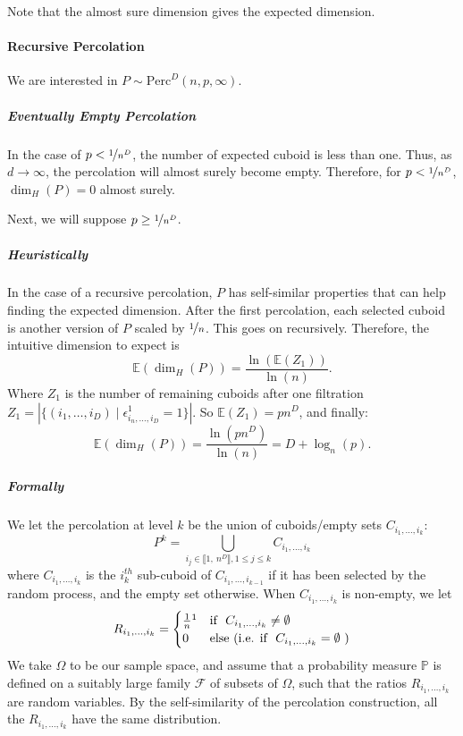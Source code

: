 Note that the almost sure dimension gives the expected dimension.

\paragraph{Recursive Percolation}
We are interested in $P \sim \text{Perc}^D(n,p,\infty)$.

\subparagraph{Eventually Empty Percolation}
In the case of $p < \nicefrac{1}{n^D}$, the number of expected cuboid is less than one.
Thus, as $d \to \infty$, the percolation will almost surely become empty.
Therefore, for $p < \nicefrac{1}{n^D}$, $\dim_H(P) = 0$ almost surely. 

Next, we will suppose $p \geq \nicefrac{1}{n^D}$.

\subparagraph{Heuristically}
In the case of a recursive percolation, $P$ has self-similar properties that can help finding the expected dimension.
After the first percolation, each selected cuboid is another version of $P$ scaled by $\nicefrac{1}{n}$.
This goes on recursively.
Therefore, the intuitive dimension to expect is 
$$\mathbb{E}(\dim_H(P)) = \frac{\ln(\mathbb{E}(Z_1))}{\ln(n)}.$$
Where $Z_1$ is the number of remaining cuboids after one filtration $Z_1 = \left| \{ (i_1,\dots,i_D) \mid \epsilon_{i_n,\dots,i_D}^1 = 1 \} \right|$.
So $\mathbb{E}(Z_1) = p n^D$, and finally:
$$\mathbb{E}(\dim_H(P)) = \frac{\ln(p n^D)}{\ln(n)} = D + \log_n(p).$$

\subparagraph{Formally}
We let the percolation at level $k$ be the union of cuboids/empty sets $C_{i_1,\dots,i_k}$:
$$
P^k = \bigcup_{i_j \in \llbracket 1, \ n^D \rrbracket, 1 \leq j \leq k} C_{i_1,\dots,i_k}
$$
where $C_{i_1,\dots,i_k}$ is the $i_k^{th}$ sub-cuboid of $C_{i_1,\dots,i_{k-1}}$ if it has been selected by the random process, and the empty set otherwise.
When $C_{i_1,\dots,i_k}$ is non-empty, we let 
\begin{equation*}
	R_{i_1,\dots,i_k} =
	\begin{cases}
		\frac{1}{n} \footnotemark & \text{if } \  C_{i_1,\dots,i_k} \neq \emptyset \\
		0 & \text{else (i.e. if } \  C_{i_1,\dots,i_k} = \emptyset \text{ )}
	\end{cases}
\end{equation*}
We take $\Omega$ to be our sample space, and assume that a probability measure $\mathbb{P}$ is defined on a suitably large family $\mathcal{F}$ of subsets of $\Omega$, such that the ratios $R_{i_1,\dots,i_k}$ are random variables.
By the self-similarity of the percolation construction, all the $R_{i_1,\dots,i_k}$ have the same distribution.

